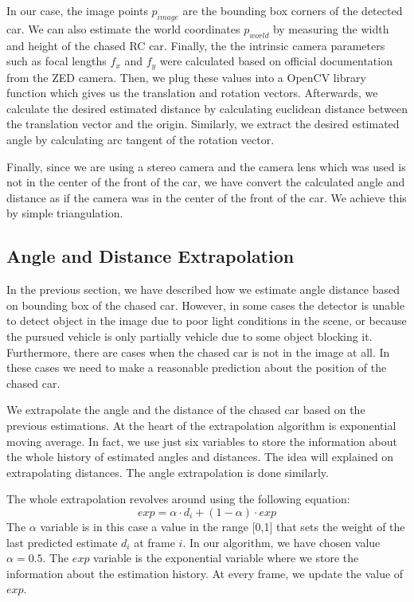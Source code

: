 In our case, the image points $p_{image}$ are the bounding box corners of the detected car. We can also estimate the world coordinates $p_{world}$ by measuring the width and height of the chased RC car. Finally, the the intrinsic camera parameters such as focal lengths $f_x$ and $f_y$ were calculated based on official documentation from the ZED camera. Then, we plug these values into a OpenCV \cite{opencv_library} library function which gives us the translation and rotation vectors. Afterwards, we calculate the desired estimated distance by calculating euclidean distance between the translation vector and the origin. Similarly, we extract the desired estimated angle by calculating arc tangent of the rotation vector. 

Finally, since we are using a stereo camera and the camera lens which was used is not in the center of the front of the car, we have convert the calculated angle and distance as if the camera was in the center of the front of the car. We achieve this by simple triangulation.

\subsection{Angle and Distance Extrapolation}
In the previous section, we have described how we estimate angle distance based on bounding box of the chased car. However, in some cases the detector is unable to detect object in the image due to poor light conditions in the scene, or because the pursued vehicle is only partially vehicle due to some object blocking it. Furthermore, there are cases when the chased car is not in the image at all. In these cases we need to make a reasonable prediction about the position of the chased car. \par


We extrapolate the angle and the distance of the chased car based on the previous estimations. At the heart of the extrapolation algorithm is exponential moving average. In fact, we use just six variables to store the information about the whole history of estimated angles and distances. The idea will explained on extrapolating distances. The angle extrapolation is done similarly. \par
The whole extrapolation revolves around using the following equation:
\begin{equation}
exp = \alpha\cdot d_i + (1-\alpha)\cdot exp
\end{equation}
The $\alpha$ variable is in this case a value in the range [0,1] that sets the weight of the last predicted estimate $d_i$ at frame $i$. In our algorithm, we have chosen value $\alpha=0.5$. The $exp$ variable is the exponential variable where we store the information about the estimation history. At every frame, we update the value of $exp$. \par

